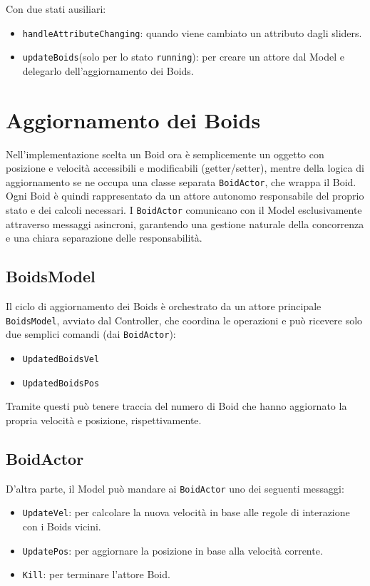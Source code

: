 \documentclass[a4paper,12pt]{report}
\begin{document}
        Con due stati ausiliari:
        \begin{itemize}
            \item \texttt{handleAttributeChanging}: quando viene cambiato un attributo dagli sliders.
            \item \texttt{updateBoids}(solo per lo stato \texttt{running}): per creare un attore dal Model e delegarlo dell'aggiornamento dei Boids.
        \end{itemize}
        
    \section{Aggiornamento dei Boids}
        Nell'implementazione scelta un Boid ora è semplicemente un oggetto con posizione e velocità accessibili e modificabili (getter/setter), mentre della logica di aggiornamento se ne occupa una classe separata \texttt{BoidActor}, che wrappa il Boid.
        Ogni Boid è quindi rappresentato da un attore autonomo responsabile del proprio stato e dei calcoli necessari. I \texttt{BoidActor} comunicano con il Model esclusivamente attraverso messaggi asincroni, garantendo una gestione naturale della concorrenza e una chiara separazione delle responsabilità.

        \subsection*{BoidsModel}
            Il ciclo di aggiornamento dei Boids è orchestrato da un attore principale \texttt{BoidsModel}, avviato dal Controller, che coordina le operazioni e può ricevere solo due semplici comandi (dai \texttt{BoidActor}):
            \begin{itemize}
                \item \texttt{UpdatedBoidsVel}
                \item \texttt{UpdatedBoidsPos}
            \end{itemize}
            Tramite questi può tenere traccia del numero di Boid che hanno aggiornato la propria velocità e posizione, rispettivamente.
        
        \subsection*{BoidActor}
            D'altra parte, il Model può mandare ai \texttt{BoidActor} uno dei seguenti messaggi:
            \begin{itemize}
                \item \texttt{UpdateVel}: per calcolare la nuova velocità in base alle regole di interazione con i Boids vicini.
                \item \texttt{UpdatePos}: per aggiornare la posizione in base alla velocità corrente.
                \item \texttt{Kill}: per terminare l'attore Boid.
            \end{itemize}
        
\end{document}
